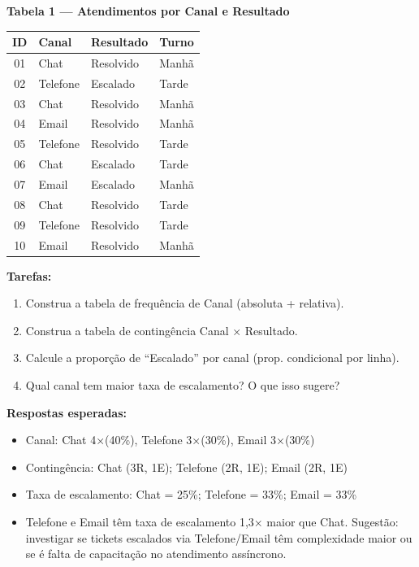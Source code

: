 \begin{BoardBox}
\textbf{Tabela 1 — Atendimentos por Canal e Resultado}

\medskip
\begin{tabular}{|c|l|l|l|}
\hline
\textbf{ID} & \textbf{Canal} & \textbf{Resultado} & \textbf{Turno} \\
\hline
01 & Chat    & Resolvido   & Manhã  \\
02 & Telefone & Escalado   & Tarde  \\
03 & Chat    & Resolvido   & Manhã  \\
04 & Email   & Resolvido   & Manhã  \\
05 & Telefone & Resolvido  & Tarde  \\
06 & Chat    & Escalado    & Tarde  \\
07 & Email   & Escalado    & Manhã  \\
08 & Chat    & Resolvido   & Tarde  \\
09 & Telefone & Resolvido  & Tarde  \\
10 & Email   & Resolvido   & Manhã  \\
\hline
\end{tabular}

\medskip
\textbf{Tarefas:}
\begin{enumerate}
  \item Construa a tabela de frequência de Canal (absoluta + relativa).
  \item Construa a tabela de contingência Canal × Resultado.
  \item Calcule a proporção de ``Escalado'' por canal (prop. condicional por linha).
  \item Qual canal tem maior taxa de escalamento? O que isso sugere?
\end{enumerate}

\textbf{Respostas esperadas:}
\begin{itemize}
  \item Canal: Chat 4×(40\%), Telefone 3×(30\%), Email 3×(30\%)
  \item Contingência: Chat (3R, 1E); Telefone (2R, 1E); Email (2R, 1E)
  \item Taxa de escalamento: Chat = 25\%; Telefone = 33\%; Email = 33\%
  \item Telefone e Email têm taxa de escalamento 1,3× maior que Chat.
  Sugestão: investigar se tickets escalados via Telefone/Email têm complexidade
  maior ou se é falta de capacitação no atendimento assíncrono.
\end{itemize}
\end{BoardBox}

